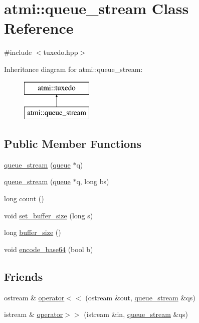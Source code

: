 \hypertarget{classatmi_1_1queue__stream}{}\section{atmi\+:\+:queue\+\_\+stream Class Reference}
\label{classatmi_1_1queue__stream}


{\ttfamily \#include $<$tuxedo.\+hpp$>$}

Inheritance diagram for atmi\+:\+:queue\+\_\+stream\+:\begin{figure}[H]
\begin{center}
\leavevmode
\includegraphics[height=2.000000cm]{classatmi_1_1queue__stream}
\end{center}
\end{figure}
\subsection*{Public Member Functions}
\begin{DoxyCompactItemize}
\item 
\hyperlink{classatmi_1_1queue__stream_a775623d6cd91a8a3cd40d9bb1e492c60}{queue\+\_\+stream} (\hyperlink{classatmi_1_1queue}{queue} $\ast$q)
\item 
\hyperlink{classatmi_1_1queue__stream_af05f48449db9ed2282643d9e7c148944}{queue\+\_\+stream} (\hyperlink{classatmi_1_1queue}{queue} $\ast$q, long bs)
\item 
long \hyperlink{classatmi_1_1queue__stream_ac4f1e88530a4d9fda0bc4b271301866b}{count} ()
\item 
void \hyperlink{classatmi_1_1queue__stream_a500b658e3f3f1a353982a1304ea27801}{set\+\_\+buffer\+\_\+size} (long s)
\item 
long \hyperlink{classatmi_1_1queue__stream_a18d01411c5ffeffd190195fd2b4dc61a}{buffer\+\_\+size} ()
\item 
void \hyperlink{classatmi_1_1queue__stream_a4a47e7caf329e46c31f44425e3ceb6e3}{encode\+\_\+base64} (bool b)
\end{DoxyCompactItemize}
\subsection*{Friends}
\begin{DoxyCompactItemize}
\item 
ostream \& \hyperlink{classatmi_1_1queue__stream_ad655c66351739698af3d404de31d3179}{operator$<$$<$} (ostream \&out, \hyperlink{classatmi_1_1queue__stream}{queue\+\_\+stream} \&qs)
\item 
istream \& \hyperlink{classatmi_1_1queue__stream_a52e264f6a625c0a453157abc46da7efe}{operator$>$$>$} (istream \&in, \hyperlink{classatmi_1_1queue__stream}{queue\+\_\+stream} \&qs)
\end{DoxyCompactItemize}
